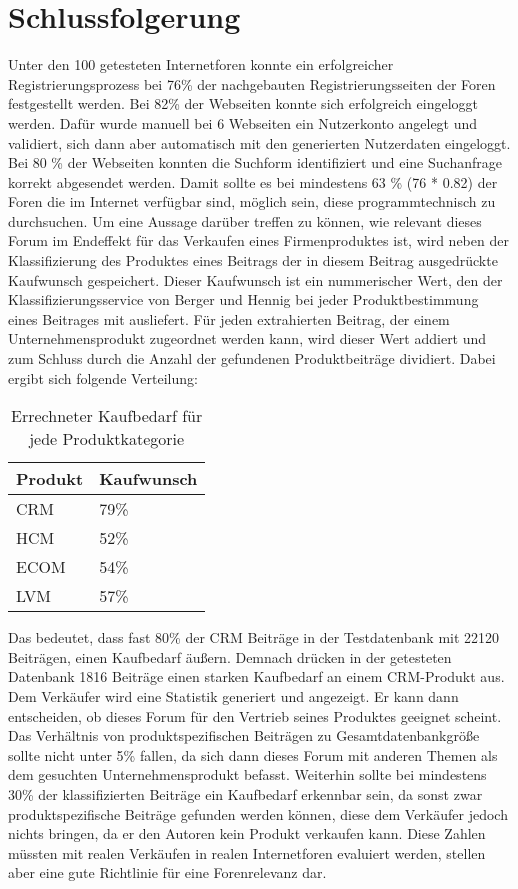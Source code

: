 \section{Schlussfolgerung}
Unter den 100 getesteten Internetforen konnte ein erfolgreicher Registrierungsprozess bei 76\% der nachgebauten Registrierungsseiten der Foren festgestellt werden. Bei 82\% der Webseiten konnte sich erfolgreich eingeloggt werden. Dafür wurde manuell bei 6 Webseiten ein Nutzerkonto angelegt und validiert, sich dann aber automatisch mit den generierten Nutzerdaten eingeloggt. Bei 80 \% der Webseiten konnten die Suchform identifiziert und eine Suchanfrage korrekt abgesendet werden. Damit sollte es bei mindestens 63 \% (76 * 0.82) der Foren die im Internet verfügbar sind, möglich sein, diese programmtechnisch zu durchsuchen.
Um eine Aussage darüber treffen zu können, wie relevant dieses Forum im Endeffekt für das Verkaufen eines Firmenproduktes ist, wird neben der Klassifizierung des Produktes eines Beitrags der in diesem Beitrag ausgedrückte Kaufwunsch gespeichert. Dieser Kaufwunsch ist ein nummerischer Wert, den der Klassifizierungsservice von Berger und Hennig\cite{n2o} bei jeder Produktbestimmung eines Beitrages mit ausliefert. Für jeden extrahierten Beitrag, der einem Unternehmensprodukt zugeordnet werden kann, wird dieser Wert addiert und zum Schluss durch die Anzahl der gefundenen Produktbeiträge dividiert. Dabei ergibt sich folgende Verteilung: 

\begin{table}[h!]
\centering
\begin{tabular}{ | p{3cm} | l |}
\hline
\textbf{Produkt} & \textbf{Kaufwunsch}\\ \hline
CRM & 79\% \\ \hline
HCM & 52\% \\ \hline
ECOM & 54\% \\ \hline
LVM & 57\% \\ \hline
\end{tabular}
\caption{Errechneter Kaufbedarf für jede Produktkategorie}
\end{table}

Das bedeutet, dass fast 80\% der CRM Beiträge in der Testdatenbank mit 22120 Beiträgen, einen Kaufbedarf äußern. Demnach drücken in der getesteten Datenbank 1816 Beiträge einen starken Kaufbedarf an einem CRM-Produkt aus. Dem Verkäufer wird eine Statistik generiert und angezeigt. Er kann dann entscheiden, ob dieses Forum für den Vertrieb seines Produktes geeignet scheint. Das Verhältnis von produktspezifischen Beiträgen zu Gesamtdatenbankgröße sollte nicht unter 5\% fallen, da sich dann dieses Forum mit anderen Themen als dem gesuchten Unternehmensprodukt befasst. Weiterhin sollte bei mindestens 30\% der klassifizierten Beiträge ein Kaufbedarf erkennbar sein, da sonst zwar produktspezifische Beiträge gefunden werden können, diese dem Verkäufer jedoch nichts bringen, da er den Autoren kein Produkt verkaufen kann. Diese Zahlen müssten mit realen Verkäufen in realen Internetforen evaluiert werden, stellen aber eine gute Richtlinie für eine Forenrelevanz dar.

